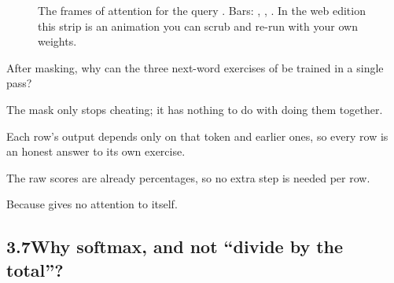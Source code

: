 \begin{figure}[h]
\centering
{}
\caption{The frames of attention for the query . Bars: , , . In the web
edition this strip is an animation you can scrub and re-run with your own weights.}
\end{figure}

\begin{checkq}
After masking, why can the three next-word exercises of  be trained in a single pass?
\begin{options}
\item The mask only stops cheating; it has nothing to do with doing them together.
\item Each row's output depends only on that token and earlier ones, so every row is an honest answer to its own exercise.
\item The raw scores are already percentages, so no extra step is needed per row.
\item Because  gives no attention to itself.
\end{options}
\end{checkq}


\subsection*{3.7\quad Why softmax, and not ``divide by the total''?}

